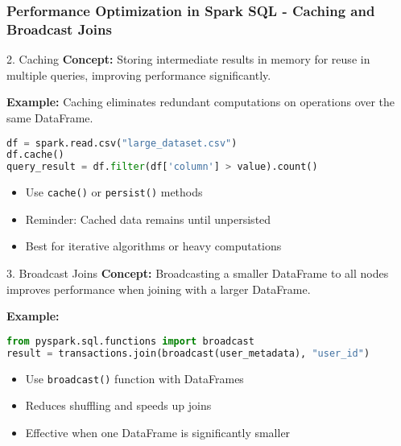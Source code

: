 \documentclass[aspectratio=169]{beamer}
\begin{document}
\begin{frame}[fragile]
    \frametitle{Performance Optimization in Spark SQL - Caching and Broadcast Joins}
    \begin{block}{2. Caching}
        \textbf{Concept:} Storing intermediate results in memory for reuse in multiple queries, improving performance significantly.
        
        \textbf{Example:} Caching eliminates redundant computations on operations over the same DataFrame.
        \begin{lstlisting}[language=Python]
df = spark.read.csv("large_dataset.csv")
df.cache()
query_result = df.filter(df['column'] > value).count()
        \end{lstlisting}
    \end{block}
    \begin{itemize}
        \item Use \texttt{cache()} or \texttt{persist()} methods
        \item Reminder: Cached data remains until unpersisted
        \item Best for iterative algorithms or heavy computations
    \end{itemize}
    
    \begin{block}{3. Broadcast Joins}
        \textbf{Concept:} Broadcasting a smaller DataFrame to all nodes improves performance when joining with a larger DataFrame.
        
        \textbf{Example:}
        \begin{lstlisting}[language=Python]
from pyspark.sql.functions import broadcast
result = transactions.join(broadcast(user_metadata), "user_id")
        \end{lstlisting}
    \end{block}
    \begin{itemize}
        \item Use \texttt{broadcast()} function with DataFrames
        \item Reduces shuffling and speeds up joins
        \item Effective when one DataFrame is significantly smaller
    \end{itemize}
\end{frame}
\end{document}
